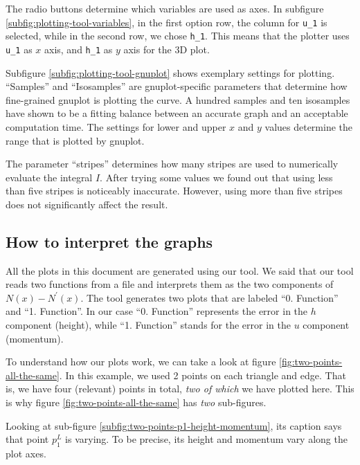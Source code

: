 \documentclass{article}
\begin{document}
The radio buttons determine which variables are used as axes. In subfigure \ref{subfig:plotting-tool-variables}, in the first option row, the column for \texttt{u\_1} is selected, while in the second row, we chose \texttt{h\_1}. This means that the plotter uses \texttt{u\_1} as $x$ axis, and \texttt{h\_1} as $y$ axis for the 3D plot.

Subfigure \ref{subfig:plotting-tool-gnuplot} shows exemplary settings for plotting. ``Samples'' and ``Isosamples'' are gnuplot-specific parameters that determine how fine-grained gnuplot is plotting the curve. A hundred samples and ten isosamples have shown to be a fitting balance between an accurate graph and an acceptable computation time. The settings for lower and upper $x$ and $y$ values determine the range that is plotted by gnuplot.

The parameter ``stripes'' determines how many stripes are used to numerically evaluate the integral $I$. After trying some values we found out that using less than five stripes is noticeably inaccurate. However, using more than five stripes does not significantly affect the result.

\subsection{How to interpret the graphs}
\label{sec:how-to-interpret-graphs}

All the plots in this document are generated using our tool. We said that our tool reads two functions from a file and interprets them as the two components of $N\left(x\right)-N^\prime\left(x\right)$. The tool generates two plots that are labeled ``0. Function'' and ``1. Function''. In our case ``0. Function'' represents the error in the $h$ component (height), while ``1. Function'' stands for the error in the $u$ component (momentum).

To understand how our plots work, we can take a look at figure \ref{fig:two-points-all-the-same}. In this example, we used 2 points on each triangle and edge. That is, we have four (relevant) points in total, \emph{two of which} we have plotted here. This is why figure \ref{fig:two-points-all-the-same} has \emph{two} sub-figures.

Looking at sub-figure \ref{subfig:two-points-p1-height-momentum}, its caption says that point $p_1^L$ is varying. To be precise, its height and momentum vary along the plot axes.
\end{document}
